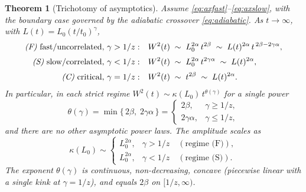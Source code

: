 \documentclass{amsart}
\newtheorem{theorem}{Theorem}
\theoremstyle{definition}
\newcommand{\asymp}{\sim}
\begin{document}
\begin{theorem}[Trichotomy of asymptotics]\label{thm:main}
Assume \eqref{eq:axfast}--\eqref{eq:axslow}, with the boundary case governed by the
adiabatic crossover \eqref{eq:adiabatic}. As $t\to\infty$, with
$L(t)=L_0(t/t_0)^{\gamma}$,
\begin{align}
  \text{\emph{(F)} fast/uncorrelated, } \gamma>1/z:\quad
    & W^2(t)\;\asymp\; L_0^{2\alpha}\,t^{2\beta}
      \;\asymp\; L(t)^{2\alpha}\,t^{\,2\beta-2\gamma\alpha},
      \label{eq:fast}\\[2pt]
  \text{\emph{(S)} slow/correlated, } \gamma<1/z:\quad
    & W^2(t)\;\asymp\; L_0^{2\alpha}\,t^{2\gamma\alpha}
      \;\asymp\; L(t)^{2\alpha},
      \label{eq:slow}\\[2pt]
  \text{\emph{(C)} critical, } \gamma=1/z:\quad
    & W^2(t)\;\asymp\; t^{2\beta}\;\asymp\;L(t)^{2\alpha}.
      \label{eq:crit}
\end{align}
In particular, in each strict regime $W^2(t)\asymp \kappa(L_0)\,t^{\theta(\gamma)}$
for a single power
\begin{equation}\label{eq:theta}
  \theta(\gamma)=\min\{\,2\beta,\;2\gamma\alpha\,\}
  =\begin{cases}2\beta, & \gamma\ge 1/z,\\[2pt] 2\gamma\alpha, & \gamma\le 1/z,\end{cases}
\end{equation}
and there are \emph{no other} asymptotic power laws. The amplitude scales as
\begin{equation}\label{eq:kappa}
  \kappa(L_0)\asymp
  \begin{cases}
    L_0^{2\alpha}, & \gamma>1/z \quad(\text{regime (F)}),\\[2pt]
    L_0^{2\alpha}, & \gamma<1/z \quad(\text{regime (S)}).
  \end{cases}
\end{equation}
The exponent $\theta(\gamma)$ is continuous, non-decreasing, concave (piecewise
linear with a single kink at $\gamma=1/z$), and equals $2\beta$ on $[1/z,\infty)$.
\end{theorem}
\end{document}
